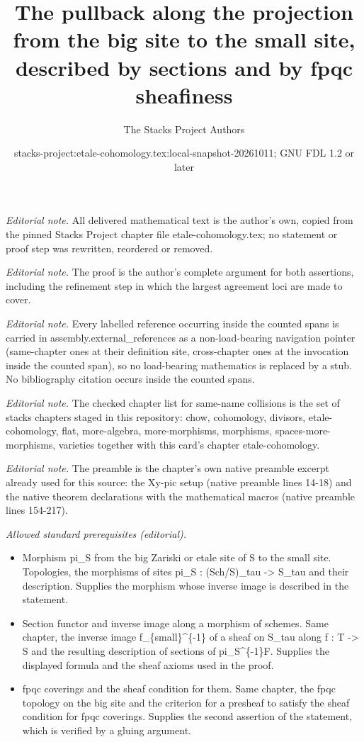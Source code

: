\documentclass[10pt,a4paper]{amsart}
\title{The pullback along the projection from the big site to the small site, described by sections and by fpqc sheafiness}
\author{The Stacks Project Authors}
\date{stacks-project:etale-cohomology.tex:local-snapshot-20261011; GNU FDL 1.2 or later}
\theoremstyle{plain}
\theoremstyle{definition}
\theoremstyle{remark}
\numberwithin{equation}{subsection}
\begin{document}
\maketitle
\noindent\textit{Editorial note.} All delivered mathematical text is the author's own, copied from the pinned Stacks Project chapter file etale-cohomology.tex; no statement or proof step was rewritten, reordered or removed.\par\medskip
\noindent\textit{Editorial note.} The proof is the author's complete argument for both assertions, including the refinement step in which the largest agreement loci are made to cover.\par\medskip
\noindent\textit{Editorial note.} Every labelled reference occurring inside the counted spans is carried in assembly.external\_references as a non-load-bearing navigation pointer (same-chapter ones at their definition site, cross-chapter ones at the invocation inside the counted span), so no load-bearing mathematics is replaced by a stub. No bibliography citation occurs inside the counted spans.\par\medskip
\noindent\textit{Editorial note.} The checked chapter list for same-name collisions is the set of stacks chapters staged in this repository: chow, cohomology, divisors, etale-cohomology, flat, more-algebra, more-morphisms, morphisms, spaces-more-morphisms, varieties together with this card's chapter etale-cohomology.\par\medskip
\noindent\textit{Editorial note.} The preamble is the chapter's own native preamble excerpt already used for this source: the Xy-pic setup (native preamble lines 14-18) and the native theorem declarations with the mathematical macros (native preamble lines 154-217).\par\medskip
\noindent\textit{Allowed standard prerequisites (editorial).}\begin{itemize}
\item Morphism pi\_S from the big Zariski or etale site of S to the small site. Topologies, the morphisms of sites pi\_S : (Sch/S)\_tau -> S\_tau and their description. Supplies the morphism whose inverse image is described in the statement.
\item Section functor and inverse image along a morphism of schemes. Same chapter, the inverse image f\_\{small\}\textasciicircum{}\{-1\} of a sheaf on S\_tau along f : T -> S and the resulting description of sections of pi\_S\textasciicircum{}\{-1\}F. Supplies the displayed formula and the sheaf axioms used in the proof.
\item fpqc coverings and the sheaf condition for them. Same chapter, the fpqc topology on the big site and the criterion for a presheaf to satisfy the sheaf condition for fpqc coverings. Supplies the second assertion of the statement, which is verified by a gluing argument.
\end{itemize}\medskip
\end{document}
